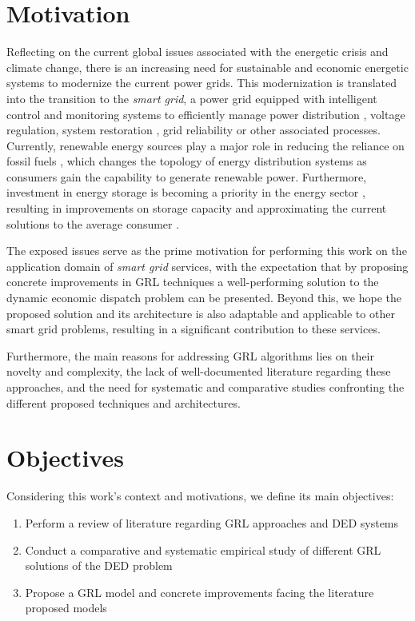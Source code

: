 \section{Motivation} \label{sec:intro-motivation}

Reflecting on the current global issues associated with the energetic crisis and climate change, there is an increasing need for sustainable and economic energetic systems to modernize the current power grids. This modernization is translated into the transition to the \textit{smart grid}, a power grid equipped with intelligent control and monitoring systems to efficiently manage power distribution \cite{chenScalableGraphReinforcement2023, liNovelGraphReinforcement2022}, voltage regulation, system restoration \cite{zhaoLearningSequentialDistribution2022}, grid reliability \cite{peiEmergencyControlStrategy2023} or other associated processes. Currently, renewable energy sources play a major role in reducing the reliance on fossil fuels \cite{RenewablesSupplied882023}, which changes the topology of energy distribution systems as consumers gain the capability to generate renewable power. Furthermore, investment in energy storage is becoming a priority in the energy sector \cite{stokerEnergyStorageOutranks2023}, resulting in improvements on storage capacity and approximating the current solutions to the average consumer \cite{lienertGMTakesTesla2022}. \par
The exposed issues serve as the prime motivation for performing this work on the application domain of \textit{smart grid} services, with the expectation that by proposing concrete improvements in \ac{GRL} techniques a well-performing solution to the dynamic economic dispatch problem can be presented. Beyond this, we hope the proposed solution and its architecture is also adaptable and applicable to other smart grid problems, resulting in a significant contribution to these services. \par
Furthermore, the main reasons for addressing \ac{GRL} algorithms lies on their novelty and complexity, the lack of well-documented literature regarding these approaches, and the need for systematic and comparative studies confronting the different proposed techniques and architectures.

\section{Objectives} \label{sec:intro-objectives}

Considering this work's context and motivations, we define its main objectives:
\begin{enumerate}
	\item Perform a review of literature regarding \ac{GRL} approaches and \ac{DED} systems
	\item Conduct a comparative and systematic empirical study of different \ac{GRL} solutions of the \ac{DED} problem
	\item Propose a \ac{GRL} model and concrete improvements facing the literature proposed models
\end{enumerate}

